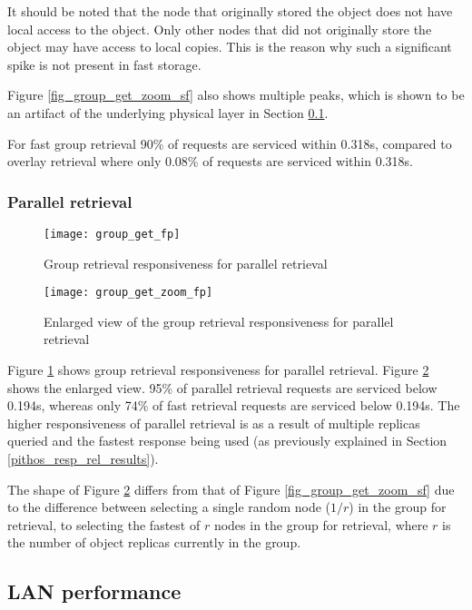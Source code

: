It should be noted that the node that originally stored the object does not have local access to the object. Only other nodes that did not originally store the object may have access to local copies. This is the reason why such a significant spike is not present in fast storage.

Figure \ref{fig_group_get_zoom_sf} also shows multiple peaks, which is shown to be an artifact of the underlying physical layer in Section \ref{lan_retrieval}.

For fast group retrieval 90\% of requests are serviced within 0.318s, compared to overlay retrieval where only 0.08\% of requests are serviced within 0.318s.

\subsubsection{Parallel retrieval}
\begin{figure}[htbp]
 \centering
 \texttt{[image: group\_get\_fp]}
 \caption{Group retrieval responsiveness for parallel retrieval}
 \label{fig_group_get_fp}
\end{figure}

\begin{figure}[htbp]
 \centering
 \texttt{[image: group\_get\_zoom\_fp]}
 \caption{Enlarged view of the group retrieval responsiveness for parallel retrieval}
 \label{fig_group_get_zoom_fp}
\end{figure}
%
Figure \ref{fig_group_get_fp} shows group retrieval responsiveness for parallel retrieval. Figure \ref{fig_group_get_zoom_fp} shows the enlarged view. 95\% of parallel retrieval requests are serviced below 0.194s, whereas only 74\% of fast retrieval requests are serviced below 0.194s. The higher responsiveness of parallel retrieval is as a result of multiple replicas queried and the fastest response being used (as previously explained in Section \ref{pithos_resp_rel_results}).

The shape of Figure \ref{fig_group_get_zoom_fp} differs from that of Figure \ref{fig_group_get_zoom_sf} due to the difference between selecting a single random node ($1/r$) in the group for retrieval, to selecting the fastest of $r$ nodes in the group for retrieval, where $r$ is the number of object replicas currently in the group.

\subsection{LAN performance}
\label{lan_retrieval}

